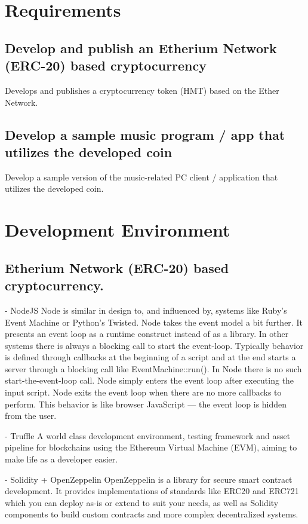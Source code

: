 \documentclass[conference]{IEEEtran}
\begin{document}
\section{Requirements}

\subsection{Develop and publish an Etherium Network (ERC-20) based cryptocurrency}
Develops and publishes a cryptocurrency token (HMT) based on the Ether Network.

\subsection{Develop a sample music program / app that utilizes the developed coin}
Develop a sample version of the music-related PC client / application that utilizes the developed coin.

\section{Development Environment}

\subsection{Etherium Network (ERC-20) based cryptocurrency.}\label{AA}
-	 NodeJS
Node is similar in design to, and influenced by, systems like Ruby's Event Machine or Python's Twisted. Node takes the event model a bit further. It presents an event loop as a runtime construct instead of as a library. In other systems there is always a blocking call to start the event-loop. Typically behavior is defined through callbacks at the beginning of a script and at the end starts a server through a blocking call like EventMachine::run(). In Node there is no such start-the-event-loop call. Node simply enters the event loop after executing the input script. Node exits the event loop when there are no more callbacks to perform. This behavior is like browser JavaScript — the event loop is hidden from the user.

-	 Truffle
A world class development environment, testing framework and asset pipeline for blockchains using the Ethereum Virtual Machine (EVM), aiming to make life as a developer easier.

-	 Solidity + OpenZeppelin
OpenZeppelin is a library for secure smart contract development. It provides implementations of standards like ERC20 and ERC721 which you can deploy as-is or extend to suit your needs, as well as Solidity components to build custom contracts and more complex decentralized systems.
\end{document}
